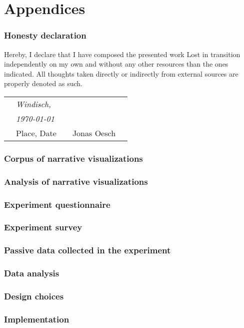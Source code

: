 \newpage
\appendix
\part{Appendices}

\section{Honesty declaration}
Hereby, I declare that I have composed the presented work Lost in transition independently on my own and without any other resources than the ones indicated. All thoughts taken directly or indirectly from external sources are properly denoted as such.
\vspace{3cm}

\centering
\begin{tabular}{p{10mm}>{\centering\arraybackslash}p{50mm}p{10mm}
>{\centering\arraybackslash}p{50mm}p{10mm}}
&\textit{\large Windisch,}&&& \\
&\textit{\large  \today}&&\hrulefill& \\
&\small Place, Date&&\small Jonas Oesch&
\end{tabular}

\newpage
\section{Corpus of narrative visualizations} \label{appendix-corpus}

\section{Analysis of narrative visualizations} \label{appendix-transition-analysis}

\section{Experiment questionnaire} \label{appendix-questionnaire}

\section{Experiment survey} \label{appendix-survey}

\section{Passive data collected in the experiment} \label{appendix-passivedata}

\section{Data analysis} \label{appendix-dataanalysis}

\section{Design choices} \label{appendix-designchoices}

\section{Implementation} \label{appendix-implementation}

